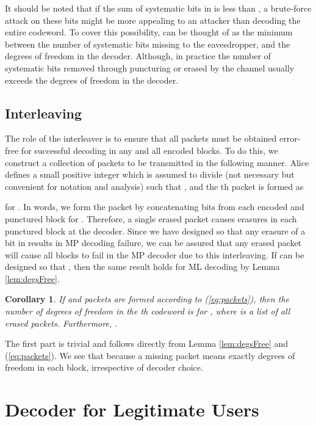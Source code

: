 \documentclass[10pt,twocolumn,twoside]{IEEEtran} \newlength{\pic}
\newtheorem{corollary}{Corollary}
\theoremstyle{definition}
\theoremstyle{remark}
\theoremstyle{plain}
\begin{document}
It should be noted that if the sum of systematic bits in  is less than , a brute-force attack on these bits might be more appealing to an attacker than decoding the entire codeword. To cover this possibility,  can be thought of as the minimum between the number of systematic bits missing to the eavesdropper, and the degrees of freedom in the decoder. Although, in practice the number of systematic bits removed through puncturing or erased by the channel usually exceeds the degrees of freedom in the decoder.

\subsection{Interleaving}\label{subsec:interleaving}

The role of the interleaver is to ensure that all packets must be obtained error-free for successful decoding in any and all encoded blocks. To do this, we construct a collection of  packets to be transmitted  in the following manner. Alice defines  a small positive integer which is assumed to divide  (not necessary but convenient for notation and analysis) such that , and the th packet is formed as

for . In words, we form the packet  by concatenating  bits from each encoded and punctured block  for . Therefore, a single erased packet causes  erasures in each punctured block at the decoder. Since we have designed  so that any erasure of a bit in  results in MP decoding failure, we can be assured that any erased packet will cause all  blocks to fail in the MP decoder due to this interleaving. If  can be designed so that , then the same result holds for ML decoding by Lemma \ref{lem:degsFree}.
\begin{corollary}\label{lem:security}
If  and packets are formed according to (\ref{eq:packets}), then the number of degrees of freedom in the th codeword is  for , where  is a list of all erased packets. Furthermore, .
\end{corollary}
\begin{IEEEproof}
 The first part is trivial and follows directly from Lemma \ref{lem:degsFree} and (\ref{eq:packets}). We see that  because a missing packet means exactly  degrees of freedom in each block, irrespective of decoder choice.
\end{IEEEproof}

\section{Decoder for Legitimate Users}\label{sec:decoder}
\end{document}
